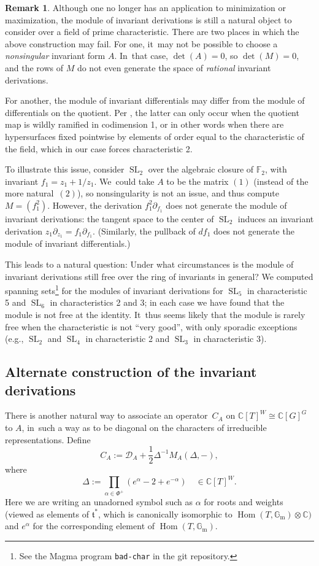 \documentclass[JEP,XML,SOM,Unicode,NoFloatCountersInSection,published]{cedram}
\theoremstyle{definition}
\newtheorem{rmk}[equation]{Remark}
\newcommand{\mft}{\mathfrak{t}}
\newcommand{\F}{\mathbb{F}}
\newcommand{\C}{\mathbb{C}}
\newcommand{\Gm}{\mathbb{G}_{\mathrm{m}}}
\newcommand{\mcD}{\mathcal{D}}
\newcommand{\emptyslot}{{-}}
\DeclareMathOperator{\SL}{SL}
\DeclareMathOperator{\Hom}{Hom}
\begin{document}
\begin{rmk} \label{finite1}
Although one no longer has an application to minimization or maximization,
the module of invariant derivations is still a natural object to consider
over a field of prime characteristic. There are two places in which the above
construction may fail. For one, it~may not be possible to choose a \emph{nonsingular}
invariant form $A$. In~that case, $\det(A)=0$, so $\det(M)=0$, and the rows of $M$ do not
even generate the space of \emph{rational} invariant derivations.

For another,
the module of invariant differentials may differ
from the module of differentials on the quotient.
Per \cite{Knighten}, the latter can only occur when the quotient map is wildly
ramified in codimension 1, or in other words when there are hypersurfaces
fixed pointwise by elements of order equal to the characteristic of the field, which in our case forces characteristic 2.

To illustrate this issue, consider $\SL_2$ over the algebraic closure of $\F_2$, with invariant $f_1=z_1+1/z_1$. We~could take $A$ to be the
matrix $(1)$ (instead of the more natural~$(2)$), so nonsingularity is not
an issue, and thus compute $M = (f_1^2)$. However, the derivation
$f_1^2\partial_{f_1}$ does not generate the module of invariant
derivations: the tangent space to the center of $\SL_2$ induces an
invariant derivation $z_1\partial_{z_1} = f_1\partial_{f_1}$. (Similarly,
the pullback of $df_1$ does not generate the module of invariant
differentials.)

This leads to a natural question: Under what circumstances is the module of invariant derivations
still free over the ring of invariants in general? We computed spanning sets\footnote{See the Magma program \texttt{bad-char} in the git repository.} for the modules of invariant derivations for $\SL_5$ in characteristic 5 and $\SL_6$ in characteristics 2 and 3; in each case we have found that the module is not free at the identity. It~thus seems likely that the module is rarely free when the characteristic is not ``very good'', with only sporadic exceptions (e.g., $\SL_2$ and $\SL_4$ in characteristic 2 and $\SL_3$ in characteristic 3).
\end{rmk}

\subsection*{Alternate construction of the invariant derivations}
There is another natural way to associate an operator~$C_A$ on $\C[T]^W\cong \C[G]^G$ to
$A$, in~such a way as to be diagonal on the characters of irreducible representations.
Define
\begin{equation} \label{C.altdef}
C_A := \mcD_A + \frac{1}{2}\Delta^{-1} M_A(\Delta,\emptyslot),
\end{equation}
where
\[
\Delta:= \prod_{\alpha\in \Phi^+} (e^{\alpha}-2+e^{-\alpha}) \quad \in \C[T]^W.
\]
Here we are writing an unadorned symbol such as $\alpha$ for roots and weights (viewed as elements of $\mft^*$, which is canonically isomorphic to $\Hom(T, \Gm) \otimes \C)$ and $e^\alpha$ for the corresponding element of $\Hom(T, \Gm)$.
\end{document}
